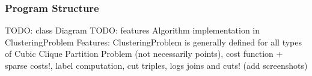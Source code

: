 \begin{frame}
    \vspace{10px}
    \vspace{5px}
    \vspace{10px}
\end{frame}


\begin{frame}
    \frametitle{Program Structure}
    TODO: class Diagram
    TODO: features
    Algorithm implementation in ClusteringProblem
    Features: ClusteringProblem is generally defined for all types of Cubic Clique Partition Problem (not necessarily points),
        cost function + sparse costs!, label computation, cut triples,
        logs joins and cuts! (add screenshots)
\end{frame}






